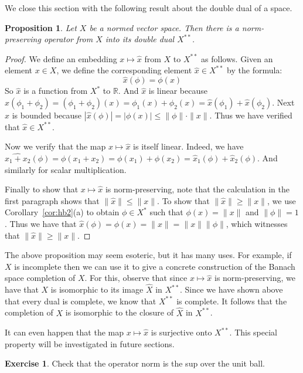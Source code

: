 \documentclass[11pt,oneside]{amsbook}
\newcommand{\RR}{{\mathbb R}}
\theoremstyle{definition}
\newtheorem{exerc}{Exercise}[section]
\theoremstyle{plain}
\newtheorem{prop}[thm]{Proposition}
\theoremstyle{definition}
\theoremstyle{remark}
\numberwithin{equation}{section}
\numberwithin{figure}{section}
\begin{document}
We close this section with the following result about the double dual of a space.

\begin{prop}
  Let $X$ be a normed vector space. Then there is a norm-preserving operator from $X$ into its double dual $X^{**}$.
\end{prop}

\begin{proof}
  We define an embedding $x\mapsto\hat x$ from $X$ to $X^{**}$ as follows. Given an element $x\in X$, we define the corresponding element $\hat x\in X^{**}$ by the formula:
  \[\hat x(\phi)=\phi(x)
  \]
  So $\hat x$ is a function from $X^*$ to $\RR$. And $\hat x$ is linear because $\hat x(\phi_1+\phi_2)=(\phi_1+\phi_2)(x)=\phi_1(x)+\phi_2(x)=\hat x(\phi_1)+\hat x(\phi_2)$. Next $\hat x$ is bounded because $|\hat x(\phi)|=|\phi(x)|\leq\|\phi\|\cdot\|x\|$. Thus we have verified that $\hat x\in X^{**}$.

  Now we verify that the map $x\mapsto\hat x$ is itself linear. Indeed, we have $\widehat{x_1+x_2}(\phi)=\phi(x_1+x_2)=\phi(x_1)+\phi(x_2)=\hat x_1(\phi)+\hat x_2(\phi)$. And similarly for scalar multiplication.

  Finally to show that $x\mapsto\hat x$ is norm-preserving, note that the calculation in the first paragraph shows that $\|\hat x\|\leq\|x\|$. To show that $\|\hat x\|\geq\|x\|$, we use Corollary~\ref{cor:hb2}(a) to obtain $\phi\in X^*$ such that $\phi(x)=\|x\|$ and $\|\phi\|=1$. Thus we have that $\hat x(\phi)=\phi(x)=\|x\|=\|x\|\|\phi\|$, which witnesses that $\|\hat x\|\geq\|x\|$.
\end{proof}

The above proposition may seem esoteric, but it has many uses. For example, if $X$ is incomplete then we can use it to give a concrete construction of the Banach space completion of $X$. For this, observe that since $x\mapsto\hat x$ is norm-preserving, we have that $X$ is isomorphic to its image $\hat X$ in $X^{**}$. Since we have shown above that every dual is complete, we know that $X^{**}$ is complete. It follows that the completion of $X$ is isomorphic to the closure of $\hat X$ in $X^{**}$.

It can even happen that the map $x\mapsto\hat x$ is surjective onto $X^{**}$. This special property will be investigated in future sections.

\begin{exerc}
  Check that the operator norm is the sup over the unit ball.
\end{exerc}
\end{document}
